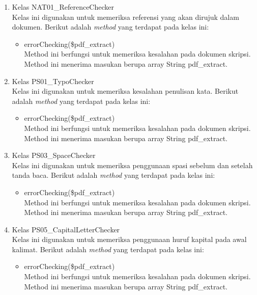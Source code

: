 \begin{enumerate}
	\item Kelas NAT01\_ReferenceChecker \\
	Kelas ini digunakan untuk memeriksa referensi yang akan dirujuk dalam dokumen. Berikut adalah \textit{method} yang terdapat pada kelas ini:
	
		\begin{itemize}
			\item errorChecking(\$pdf\_extract) \\
			Method ini berfungsi untuk memeriksa kesalahan pada dokumen skripsi. Method ini menerima masukan berupa array String pdf\_extract.
		\end{itemize}
			
	\item Kelas PS01\_TypoChecker \\
	Kelas ini digunakan untuk memeriksa kesalahan penulisan kata. Berikut adalah \textit{method} yang terdapat pada kelas ini:
	
		\begin{itemize}
			\item errorChecking(\$pdf\_extract) \\
			Method ini berfungsi untuk memeriksa kesalahan pada dokumen skripsi. Method ini menerima masukan berupa array String pdf\_extract.
		\end{itemize}
			
	\item Kelas PS03\_SpaceChecker \\
	Kelas ini digunakan untuk memeriksa penggunaan spasi sebelum dan setelah tanda baca. Berikut adalah \textit{method} yang terdapat pada kelas ini:	
	
		\begin{itemize}
			\item errorChecking(\$pdf\_extract) \\
			Method ini berfungsi untuk memeriksa kesalahan pada dokumen skripsi. Method ini menerima masukan berupa array String pdf\_extract.
		\end{itemize}
			
	\item Kelas PS05\_CapitalLetterChecker \\
	Kelas ini digunakan untuk memeriksa penggunaan huruf kapital pada awal kalimat. Berikut adalah \textit{method} yang terdapat pada kelas ini:
		
		\begin{itemize}
			\item errorChecking(\$pdf\_extract) \\
			Method ini berfungsi untuk memeriksa kesalahan pada dokumen skripsi. Method ini menerima masukan berupa array String pdf\_extract.
		\end{itemize}
			

\end{enumerate}
